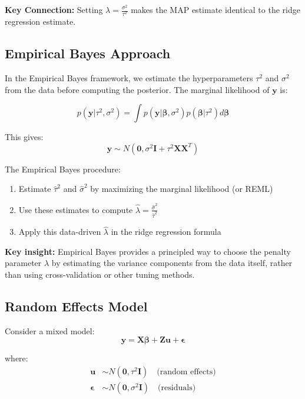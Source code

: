 \documentclass[12pt]{article}
\begin{document}
\textbf{Key Connection:} Setting $\lambda = \frac{\sigma^2}{\tau^2}$ makes the MAP estimate identical to the ridge regression estimate.

\subsection{Empirical Bayes Approach}

In the Empirical Bayes framework, we estimate the hyperparameters $\tau^2$ and $\sigma^2$ from the data before computing the posterior. The marginal likelihood of $\mathbf{y}$ is:

\begin{equation}
p(\mathbf{y}|\tau^2, \sigma^2) = \int p(\mathbf{y}|\boldsymbol{\beta}, \sigma^2) p(\boldsymbol{\beta}|\tau^2) d\boldsymbol{\beta}
\end{equation}

This gives:
\begin{equation}
\mathbf{y} \sim N(\mathbf{0}, \sigma^2\mathbf{I} + \tau^2\mathbf{X}\mathbf{X}^T)
\end{equation}

The Empirical Bayes procedure:
\begin{enumerate}
    \item Estimate $\hat{\tau}^2$ and $\hat{\sigma}^2$ by maximizing the marginal likelihood (or REML)
    \item Use these estimates to compute $\hat{\lambda} = \frac{\hat{\sigma}^2}{\hat{\tau}^2}$
    \item Apply this data-driven $\hat{\lambda}$ in the ridge regression formula
\end{enumerate}

\textbf{Key insight:} Empirical Bayes provides a principled way to choose the penalty parameter $\lambda$ by estimating the variance components from the data itself, rather than using cross-validation or other tuning methods.

\subsection{Random Effects Model}

Consider a mixed model:
\begin{equation}
\mathbf{y} = \mathbf{X}\boldsymbol{\beta} + \mathbf{Z}\mathbf{u} + \boldsymbol{\epsilon}
\end{equation}

where:
\begin{align}
\mathbf{u} &\sim N(\mathbf{0}, \tau^2\mathbf{I}) \quad \text{(random effects)} \\
\boldsymbol{\epsilon} &\sim N(\mathbf{0}, \sigma^2\mathbf{I}) \quad \text{(residuals)}
\end{align}
\end{document}
